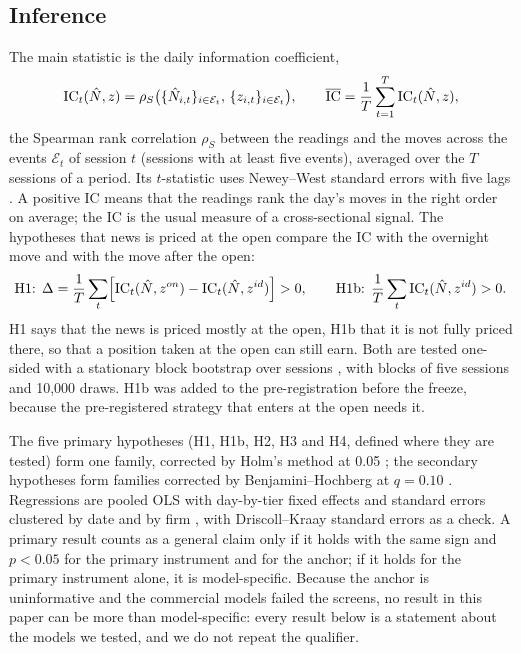 \subsection{Inference}\label{sec:inference}

The main statistic is the daily information coefficient,
\begin{equation}\label{eq:ic}
\mathrm{IC}_t(\hat N, z) = \rho_{S}\bigl(\{\hat N_{i,t}\}_{i \in \mathcal{E}_t},\, \{z_{i,t}\}_{i \in \mathcal{E}_t}\bigr),
\qquad
\overline{\mathrm{IC}} = \frac{1}{T}\sum_{t=1}^{T} \mathrm{IC}_t(\hat N, z),
\end{equation}
the Spearman rank correlation $\rho_{S}$ between the readings and the moves across the events $\mathcal{E}_t$ of
session $t$ (sessions with at least five events), averaged over the $T$ sessions of a period. Its $t$-statistic
uses Newey--West standard errors with five lags \citep{newey1987}. A positive IC means that the readings rank
the day's moves in the right order on average; the IC is the usual measure of a cross-sectional signal. The
hypotheses that news is priced at the open compare the IC with the overnight move and with the move after the
open:
\begin{equation}\label{eq:h1}
\text{H1: } \Delta = \frac{1}{T}\sum_{t}\Bigl[\mathrm{IC}_t(\hat N, z^{on}) - \mathrm{IC}_t(\hat N, z^{id})\Bigr] > 0,
\qquad
\text{H1b: } \frac{1}{T}\sum_{t} \mathrm{IC}_t(\hat N, z^{id}) > 0.
\end{equation}
H1 says that the news is priced mostly at the open, H1b that it is not fully priced there, so that a position
taken at the open can still earn. Both are tested one-sided with a stationary block bootstrap over sessions
\citep{politis1994}, with blocks of five sessions and 10,000 draws. H1b was added to the pre-registration before
the freeze, because the pre-registered strategy that enters at the open needs it.

The five primary hypotheses (H1, H1b, H2, H3 and H4, defined where they are tested) form one family, corrected by
Holm's method at 0.05 \citep{holm1979}; the secondary hypotheses form families corrected by
Benjamini--Hochberg at $q = 0.10$ \citep{benjamini1995}. Regressions are pooled OLS with day-by-tier fixed
effects and standard errors clustered by date and by firm \citep{cameron2011}, with Driscoll--Kraay standard
errors \citep{driscoll1998} as a check. A primary result counts as a general claim only if it holds with the same
sign and $p < 0.05$ for the primary instrument and for the anchor; if it holds for the primary instrument alone,
it is model-specific. Because the anchor is uninformative and the commercial models failed the screens, no
result in this paper can be more than model-specific: every result below is a statement about the models we
tested, and we do not repeat the qualifier.
